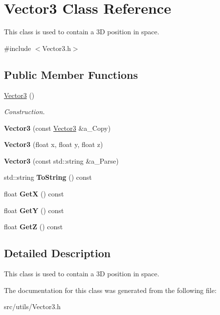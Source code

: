 \hypertarget{class_vector3}{}\section{Vector3 Class Reference}
\label{class_vector3}


This class is used to contain a 3D position in space.  




{\ttfamily \#include $<$Vector3.\+h$>$}

\subsection*{Public Member Functions}
\begin{DoxyCompactItemize}
\item 
\mbox{\label{class_vector3_a0f49191f7e001e7f7ae1cb49522118b4}} 
\hyperlink{class_vector3_a0f49191f7e001e7f7ae1cb49522118b4}{Vector3} ()
\begin{DoxyCompactList}\small\item\em Construction. \end{DoxyCompactList}\item 
\mbox{\label{class_vector3_adf275ef20a51848b5ab6e16822d8199a}} 
{\bfseries Vector3} (const \hyperlink{class_vector3}{Vector3} \&a\+\_\+\+Copy)
\item 
\mbox{\label{class_vector3_ad53e22b52babdb90d423601f72467590}} 
{\bfseries Vector3} (float x, float y, float z)
\item 
\mbox{\label{class_vector3_a5a9976ee2a57c8217c11458684d63274}} 
{\bfseries Vector3} (const std\+::string \&a\+\_\+\+Parse)
\item 
\mbox{\label{class_vector3_a093488f4473e218692aca12024c39e24}} 
std\+::string {\bfseries To\+String} () const
\item 
\mbox{\label{class_vector3_a5ffb65f126e9f829aa60a4ff9e1d3531}} 
float {\bfseries GetX} () const
\item 
\mbox{\label{class_vector3_a0a717bb15abe9e177881730a92f94046}} 
float {\bfseries GetY} () const
\item 
\mbox{\label{class_vector3_a0ff6bc6ea6247b62e59230a86976cda6}} 
float {\bfseries GetZ} () const
\end{DoxyCompactItemize}


\subsection{Detailed Description}
This class is used to contain a 3D position in space. 

The documentation for this class was generated from the following file\+:\begin{DoxyCompactItemize}
\item 
src/utils/Vector3.\+h\end{DoxyCompactItemize}
